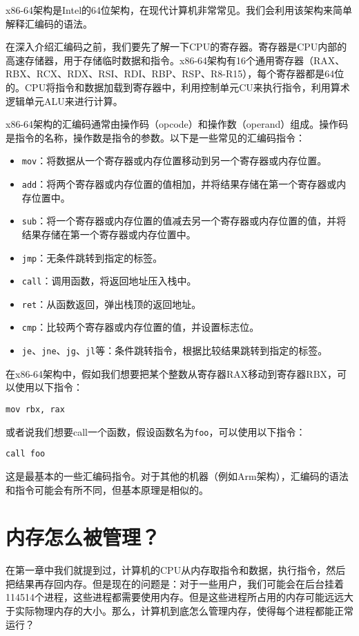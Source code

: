 \documentclass[../main.tex]{subfiles}
\begin{document}
x86-64架构是Intel的64位架构，在现代计算机非常常见。我们会利用该架构来简单解释汇编码的语法。

在深入介绍汇编码之前，我们要先了解一下CPU的寄存器。寄存器是CPU内部的高速存储器，用于存储临时数据和指令。x86-64架构有16个通用寄存器（RAX、RBX、RCX、RDX、RSI、RDI、RBP、RSP、R8-R15），每个寄存器都是64位的。CPU将指令和数据加载到寄存器中，利用控制单元CU来执行指令，利用算术逻辑单元ALU来进行计算。

x86-64架构的汇编码通常由操作码（opcode）和操作数（operand）组成。操作码是指令的名称，操作数是指令的参数。以下是一些常见的汇编码指令：
\begin{itemize}
  \item \texttt{mov}：将数据从一个寄存器或内存位置移动到另一个寄存器或内存位置。
  \item \texttt{add}：将两个寄存器或内存位置的值相加，并将结果存储在第一个寄存器或内存位置中。
  \item \texttt{sub}：将一个寄存器或内存位置的值减去另一个寄存器或内存位置的值，并将结果存储在第一个寄存器或内存位置中。
  \item \texttt{jmp}：无条件跳转到指定的标签。
  \item \texttt{call}：调用函数，将返回地址压入栈中。
  \item \texttt{ret}：从函数返回，弹出栈顶的返回地址。
  \item \texttt{cmp}：比较两个寄存器或内存位置的值，并设置标志位。
  \item \texttt{je}、\texttt{jne}、\texttt{jg}、\texttt{jl}等：条件跳转指令，根据比较结果跳转到指定的标签。
\end{itemize}

在x86-64架构中，假如我们想要把某个整数从寄存器RAX移动到寄存器RBX，可以使用以下指令：
\begin{lstlisting}
mov rbx, rax
\end{lstlisting}
或者说我们想要call一个函数，假设函数名为\texttt{foo}，可以使用以下指令：
\begin{lstlisting}
call foo
\end{lstlisting}
这是最基本的一些汇编码指令。对于其他的机器（例如Arm架构），汇编码的语法和指令可能会有所不同，但基本原理是相似的。

\section{内存怎么被管理？}

在第一章中我们就提到过，计算机的CPU从内存取指令和数据，执行指令，然后把结果再存回内存。但是现在的问题是：对于一些用户，我们可能会在后台挂着114514个进程，这些进程都需要使用内存。但是这些进程所占用的内存可能远远大于实际物理内存的大小。那么，计算机到底怎么管理内存，使得每个进程都能正常运行？
\end{document}
